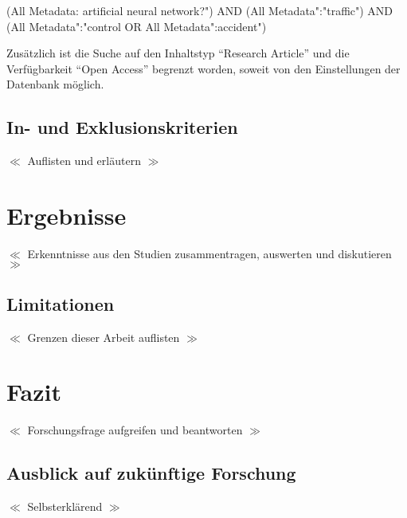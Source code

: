 \documentclass{scrartcl}
\begin{document}
\begin{tcolorbox}[
      enhanced,
      attach boxed title to top left,
      colback=gray!20,
      colframe=gray,
      colbacktitle=gray,
      title=IEEE Explore,
      fonttitle=\bfseries\color{black},
      boxed title style={size=small, colframe=gray, sharp corners},
      sharp corners
   ]
   (\dq All Metadata\dq: \dq artificial neural network?")
   AND (\dq All Metadata":"traffic")
   AND (\dq All Metadata":"control\dq\space
   OR \dq All Metadata":\dq accident")
\end{tcolorbox}

Zusätzlich ist die Suche auf den Inhaltstyp \enquote{Research Article}
und die Verfügbarkeit \enquote{Open Access} begrenzt worden, soweit von
den Einstellungen der Datenbank möglich.

\subsection{In- und Exklusionskriterien}

$\ll$ Auflisten und erläutern $\gg$

\section{Ergebnisse}

$\ll$ Erkenntnisse aus den Studien zusammentragen, auswerten und diskutieren $\gg$

\subsection{Limitationen}

$\ll$ Grenzen dieser Arbeit auflisten $\gg$

\section{Fazit}

$\ll$ Forschungsfrage aufgreifen und beantworten $\gg$

\subsection{Ausblick auf zukünftige Forschung}

$\ll$ Selbsterklärend $\gg$

\printbibliography

\listoffigures
\listoftables
\end{document}

